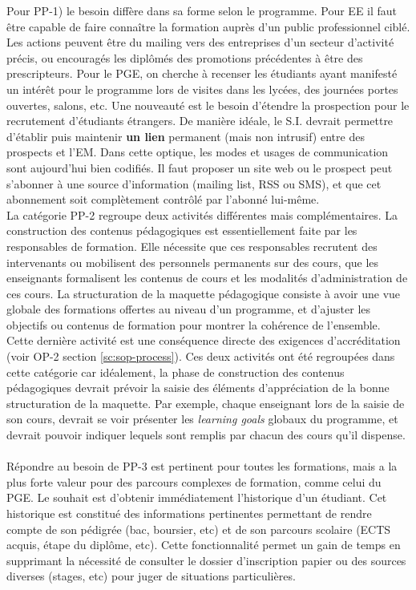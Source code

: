 \documentclass{book}
\begin{document}
Pour PP-1) le besoin diffère dans sa forme selon le programme. Pour EE il faut 
être capable de faire connaître la formation auprès d'un public professionnel 
ciblé. Les actions peuvent être du mailing vers des entreprises d'un secteur 
d'activité précis, ou encouragés les diplômés des promotions précédentes à être 
des prescripteurs. Pour le PGE, on cherche à recenser les étudiants ayant manifesté 
un intérêt pour le programme lors de visites dans les lycées, des journées portes 
ouvertes, salons, etc. Une nouveauté est le besoin d'étendre la prospection pour 
le recrutement d'étudiants étrangers. 
De manière idéale, le S.I. devrait permettre d'établir puis maintenir \textbf{un 
lien} permanent (mais non intrusif) entre des prospects et l'EM. Dans cette optique, 
les modes et usages de communication sont aujourd'hui bien codifiés. Il faut proposer 
un site web ou le prospect peut s'abonner à une source d'information (mailing list,
RSS ou SMS), et que cet abonnement soit complètement contrôlé par l'abonné lui-même.
~\\


La catégorie PP-2 regroupe deux activités différentes mais complémentaires. La 
construction des contenus pédagogiques est essentiellement faite par les responsables de 
formation. Elle nécessite que ces responsables recrutent des intervenants ou mobilisent 
des personnels permanents sur des cours, que les enseignants formalisent les contenus de 
cours et les modalités d'administration de ces cours. La structuration de la maquette 
pédagogique consiste à avoir une vue globale des formations offertes au niveau d'un 
programme, et d'ajuster les objectifs ou contenus de formation pour montrer la cohérence 
de l'ensemble. Cette dernière activité est une conséquence directe des exigences 
d'accréditation (voir OP-2 section \ref{sc:sop-process}). Ces deux activités ont été
regroupées dans cette catégorie car idéalement, la phase de construction des contenus 
pédagogiques devrait prévoir la saisie des éléments d'appréciation de la bonne structuration
de la maquette. Par exemple, chaque enseignant lors de la saisie de son cours, devrait se
voir présenter les \emph{learning goals} globaux du programme, et devrait pouvoir 
indiquer lequels sont remplis par chacun des cours qu'il dispense.
~\\

Répondre au besoin de PP-3 est pertinent pour toutes les formations, mais
a la plus forte valeur pour des parcours complexes de formation, comme celui du PGE.
Le souhait est d'obtenir immédiatement l'historique d'un étudiant. Cet historique
est constitué des informations pertinentes permettant de rendre compte de son pédigrée
(bac, boursier, etc)  et de son parcours scolaire (ECTS acquis, étape du diplôme, etc).
Cette fonctionnalité permet un gain de temps en supprimant la nécessité de consulter
le dossier d'inscription papier ou des sources diverses (stages, etc) pour juger
de situations particulières.
~\\
\end{document}
